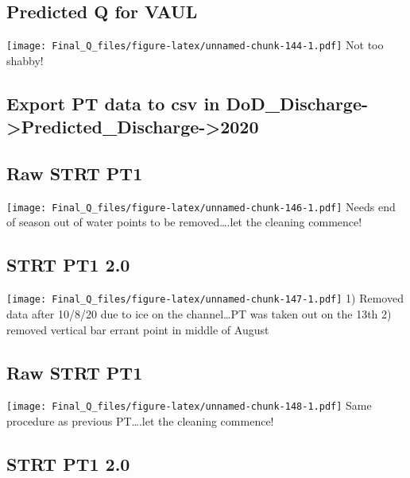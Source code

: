 \documentclass[
]{article}
\begin{document}
\hypertarget{predicted-q-for-vaul}{%
\subsection{Predicted Q for VAUL}\label{predicted-q-for-vaul}}

\texttt{[image: Final\_Q\_files/figure-latex/unnamed-chunk-144-1.pdf]} Not
too shabby!

\hypertarget{export-pt-data-to-csv-in-dod_discharge-predicted_discharge-2020-3}{%
\subsection{Export PT data to csv in
DoD\_Discharge-\textgreater Predicted\_Discharge-\textgreater2020}\label{export-pt-data-to-csv-in-dod_discharge-predicted_discharge-2020-3}}

\hypertarget{raw-strt-pt1}{%
\subsection{Raw STRT PT1}\label{raw-strt-pt1}}

\texttt{[image: Final\_Q\_files/figure-latex/unnamed-chunk-146-1.pdf]}
Needs end of season out of water points to be removed\ldots.let the
cleaning commence!

\hypertarget{strt-pt1-2.0}{%
\subsection{STRT PT1 2.0}\label{strt-pt1-2.0}}

\texttt{[image: Final\_Q\_files/figure-latex/unnamed-chunk-147-1.pdf]} 1)
Removed data after 10/8/20 due to ice on the channel\ldots PT was taken
out on the 13th 2) removed vertical bar errant point in middle of August

\hypertarget{raw-strt-pt1-1}{%
\subsection{Raw STRT PT1}\label{raw-strt-pt1-1}}

\texttt{[image: Final\_Q\_files/figure-latex/unnamed-chunk-148-1.pdf]}
Same procedure as previous PT\ldots.let the cleaning commence!

\hypertarget{strt-pt1-2.0-1}{%
\subsection{STRT PT1 2.0}\label{strt-pt1-2.0-1}}
\end{document}
